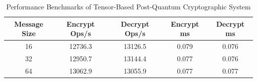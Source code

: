 \begin{table}[h]
\centering
\begin{tabular}{|c|c|c|c|c|}
\hline
Message Size & Encrypt Ops/s & Decrypt Ops/s & Encrypt ms & Decrypt ms \\
\hline
16 & 12736.3 & 13126.5 & 0.079 & 0.076 \\
32 & 12950.7 & 13144.4 & 0.077 & 0.076 \\
64 & 13062.9 & 13055.9 & 0.077 & 0.077 \\
\hline
\end{tabular}
\caption{Performance Benchmarks of Tensor-Based Post-Quantum Cryptographic System}
\label{tab:performance}
\end{table}